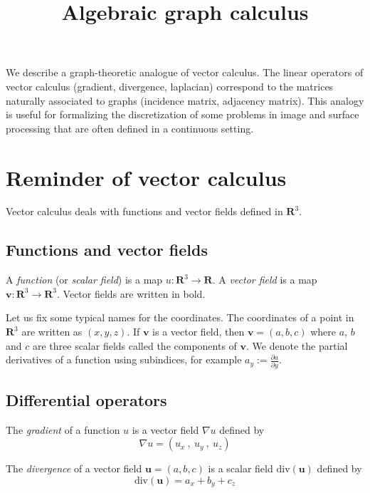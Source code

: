 \title{Algebraic graph calculus}



\newcommand{\1}{\mathbf{1}}
\newcommand{\R}{\mathbf{R}}




We describe a graph-theoretic analogue of vector calculus.  The linear
operators of vector calculus (gradient, divergence, laplacian) correspond to
the matrices naturally associated to graphs (incidence matrix, adjacency
matrix).  This analogy is useful for formalizing the discretization of some
problems in image and surface processing that are often defined in a continuous
setting.




\section{Reminder of vector calculus}


Vector calculus deals with functions and vector fields defined in $\R^3$.



\subsection{Functions and vector fields}


A \emph{function} (or \emph{scalar field}) is a map $u:\R^3\to\R$.
A \emph{vector field} is a map $\mathbf{v}:\R^3\to\R^3$.
Vector fields are written in bold.



Let us fix some typical names for the coordinates.
The coordinates of a point in $\R^3$ are written as $(x,y,z)$.
If $\mathbf{v}$ is a vector field, then $\mathbf{v}=(a,b,c)$ where $a$, $b$
and $c$ are three scalar fields called the components of $\mathbf{v}$.
We denote the partial derivatives of a function using subindices, for
example $a_y:=\frac{\partial a}{\partial y}$.


\subsection{Differential operators}


The \emph{gradient} of a function $u$ is a vector field $\nabla u$ defined
by
\[
\nabla u = \left(
u_x\ ,\ u_y\ ,\ u_z
\right)
\]




The \emph{divergence} of a vector field $\mathbf{u}=(a,b,c)$ is a scalar
field $\mathrm{div}(\mathbf{u})$ defined by
\[
\mathrm{div}(\mathbf{u}) =
a_x + b_y + c_z
\]




